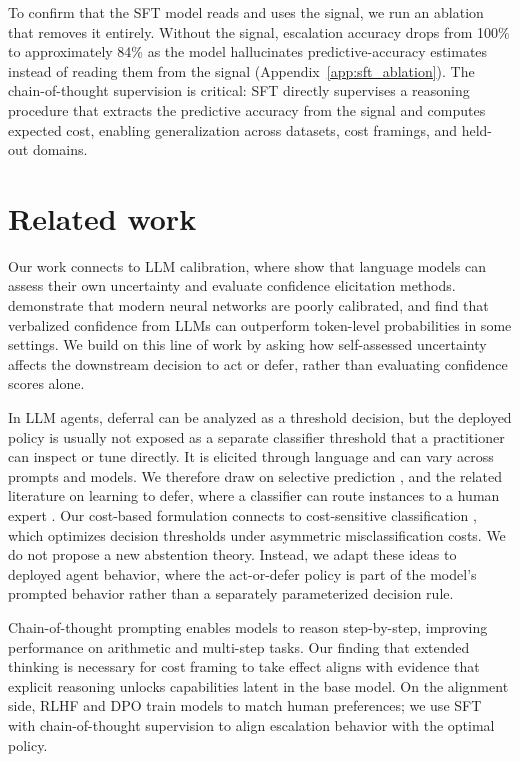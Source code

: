 \documentclass{article}
\begin{document}
To confirm that the SFT model reads and uses the signal, we run an ablation that removes it entirely. Without the signal, escalation accuracy drops from 100\% to approximately 84\% as the model hallucinates predictive-accuracy estimates instead of reading them from the signal (Appendix~\ref{app:sft_ablation}). The chain-of-thought supervision is critical: SFT directly supervises a reasoning procedure that extracts the predictive accuracy from the signal and computes expected cost, enabling generalization across datasets, cost framings, and held-out domains.


\section{Related work}
\label{sec:related}

Our work connects to LLM calibration, where \citet{kadavath2022language} show that language models can assess their own uncertainty and \citet{xiong2024can} evaluate confidence elicitation methods. \citet{guo2017calibration} demonstrate that modern neural networks are poorly calibrated, and \citet{tian2023just} find that verbalized confidence from LLMs can outperform token-level probabilities in some settings. We build on this line of work by asking how self-assessed uncertainty affects the downstream decision to act or defer, rather than evaluating confidence scores alone.

In LLM agents, deferral can be analyzed as a threshold decision, but the deployed policy is usually not exposed as a separate classifier threshold that a practitioner can inspect or tune directly. It is elicited through language and can vary across prompts and models. We therefore draw on selective prediction \citep{geifman2017selective}, and the related literature on learning to defer, where a classifier can route instances to a human expert \citep{madras2018predict, mozannar2020consistent}. Our cost-based formulation connects to cost-sensitive classification \citep{elkan2001foundations}, which optimizes decision thresholds under asymmetric misclassification costs. We do not propose a new abstention theory. Instead, we adapt these ideas to deployed agent behavior, where the act-or-defer policy is part of the model's prompted behavior rather than a separately parameterized decision rule.

Chain-of-thought prompting \citep{wei2022chain} enables models to reason step-by-step, improving performance on arithmetic and multi-step tasks. Our finding that extended thinking is necessary for cost framing to take effect aligns with evidence that explicit reasoning unlocks capabilities latent in the base model. On the alignment side, RLHF \citep{ouyang2022training} and DPO \citep{rafailov2023direct} train models to match human preferences; we use SFT with chain-of-thought supervision to align escalation behavior with the optimal policy.
\end{document}
